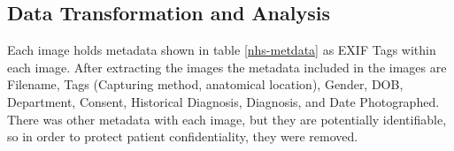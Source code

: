 \subsection{Data Transformation and Analysis}


Each image holds metadata shown in table \ref{nhs-metdata} as EXIF Tags within each image. After extracting the images the metadata included in the images are Filename, Tags (Capturing method, anatomical location), Gender, DOB, Department, Consent, Historical Diagnosis, Diagnosis, and Date Photographed. There was other metadata with each image, but they are potentially identifiable, so in order to protect patient confidentiality, they were removed. 



